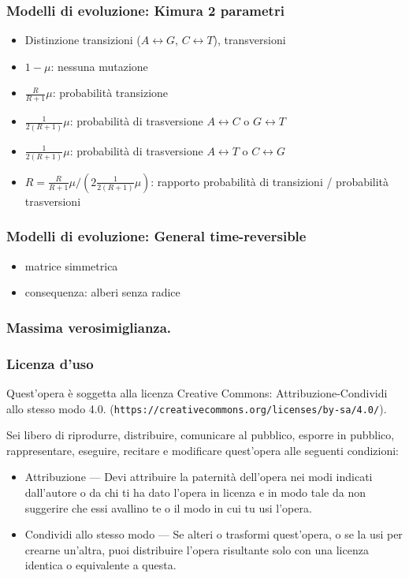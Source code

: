 \begin{frame}[fragile]
  \frametitle{Modelli di evoluzione: Kimura 2 parametri}
\begin{itemize}
\item
  Distinzione transizioni ($A\leftrightarrow G$, $C\leftrightarrow T$), transversioni
\item
  $1-\mu$: nessuna mutazione
\item
  $\frac{R}{R+1}\mu$: probabilità transizione
\item
  $\frac{1}{2(R+1)}\mu$: probabilità di trasversione $A\leftrightarrow C$ o $G\leftrightarrow T$
\item
  $\frac{1}{2(R+1)}\mu$: probabilità di trasversione $A\leftrightarrow T$ o $C\leftrightarrow G$
\item
  $R = \frac{R}{R+1}\mu / \left(2 \frac{1}{2(R+1)}\mu \right)$: rapporto probabilità di transizioni / probabilità trasversioni
\end{itemize}
\end{frame}

\begin{frame}[fragile]
  \frametitle{Modelli di evoluzione: General time-reversible}
\begin{itemize}
\item
  matrice simmetrica
\item
  consequenza: alberi senza radice
\end{itemize}
\end{frame}


\begin{frame}[fragile]
\frametitle{Massima verosimiglianza.}
\end{frame}



\begin{frame}[containsverbatim]\frametitle{Licenza d'uso}
  \small

  Quest'opera {\`e} soggetta alla licenza Creative Commons:
Attribuzione-Condividi allo stesso modo 4.0.
  (\verb+https://creativecommons.org/licenses/by-sa/4.0/+).

Sei libero di riprodurre, distribuire, comunicare al pubblico, esporre
in pubblico, rappresentare, eseguire, recitare e modificare quest'opera
alle seguenti condizioni:
\begin{itemize}
\item
Attribuzione — Devi attribuire la paternit{\`a} dell'opera nei modi
indicati dall'autore o da chi ti ha dato l'opera in licenza e in modo tale da
non suggerire che essi avallino te o il modo in cui tu usi l'opera.
\item
Condividi allo stesso modo — Se alteri o trasformi quest'opera, o se
la usi per crearne un'altra, puoi distribuire l'opera risultante solo con
una licenza identica o equivalente a  questa.
\end{itemize}
\end{frame}



